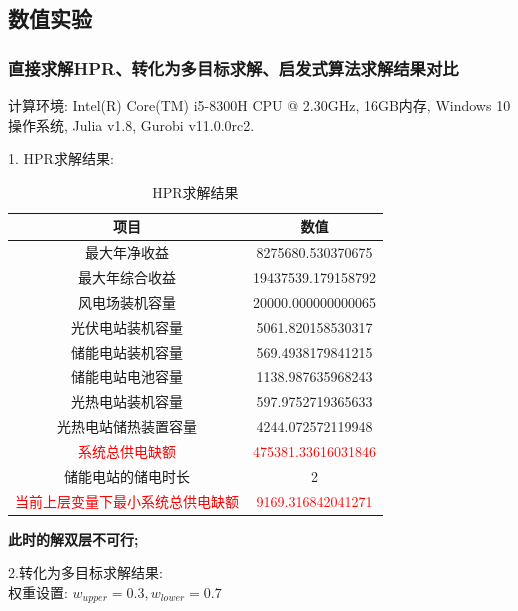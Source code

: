 \documentclass{article}
\begin{document}
\clearpage
\subsection{数值实验}
\subsubsection{直接求解HPR、转化为多目标求解、启发式算法求解结果对比}
计算环境: Intel(R) Core(TM) i5-8300H CPU @ 2.30GHz, 16GB内存, Windows 10操作系统, Julia v1.8, Gurobi v11.0.0rc2.

 1. HPR求解结果:
\begin{table}[H]
    \centering
    \caption{HPR求解结果}
    \label{tab:energy_system_data}
    \begin{tabular}{c|c}
        \toprule
        \textbf{项目} & \textbf{数值} \\
        \midrule
        最大年净收益 & 8275680.530370675 \\
        最大年综合收益 & 19437539.179158792 \\
        风电场装机容量 & 20000.000000000065 \\
        光伏电站装机容量 & 5061.820158530317 \\
        储能电站装机容量 & 569.4938179841215 \\
        储能电站电池容量 & 1138.987635968243 \\
        光热电站装机容量 & 597.9752719365633 \\
        光热电站储热装置容量 & 4244.072572119948 \\
        \textcolor{red}{系统总供电缺额} & \textcolor{red}{475381.33616031846} \\
        储能电站的储电时长 & 2 \\
        \textcolor{red}{当前上层变量下最小系统总供电缺额} & \textcolor{red}{9169.316842041271} \\
        \bottomrule
    \end{tabular}
\end{table}

\bf{此时的解双层不可行};
    
2.转化为多目标求解结果: \\
权重设置: $w_{upper}=0.3, w_{lower}=0.7$
\end{document}
